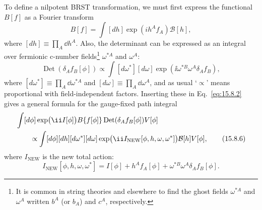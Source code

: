 To define a nilpotent BRST transformation, we must first express the functional $B[f]$ as a Fourier transform
\begin{equation}
 B[f]=\int[dh]\exp(ih^Af_A)\mathcal B[h],
 \tag{15.8.4}\label{eq:15.8.4}
\end{equation}
where $[dh]\equiv\prod_A \dd h^A$. Also, the determinant can be expressed as an integral over fermionic c-number fields\footnote{It is common in string theories and elsewhere to find the ghost fields $\omega^{*A}$ and $\omega^A$ written $b^A$ (or $b_A$) and $c^A$, respectively.} $\omega^{*A}$ and $\omega^A$:
\begin{equation}
 \operatorname{Det}(\delta_Af_B[\phi])\propto
 \int[d\omega^*][d\omega]\exp\left(\ii\omega^{*B}\omega^A\delta_Af_B\right),
 \tag{15.8.5}\label{eq:15.8.5}
\end{equation}
where $[d\omega^*]\equiv\prod_A \dd\omega^{*A}$ and $[d\omega]\equiv\prod_A \dd\omega^A$, and as usual `$\propto$' means proportional with field-independent factors. Inserting these in Eq.~\eqref{eq:15.8.2} gives a general formula for the gauge-fixed path integral
\begin{align}
 &\int[d\phi]\exp\bigl(\ii I[\phi]\bigr)B\{f[\phi]\}\operatorname{Det}(\delta_Af_B[\phi])V[\phi]\notag\\
 &\qquad\propto\int[d\phi][dh][d\omega^*][d\omega]
 \exp\bigl(\ii I_{\mathrm{NEW}}[\phi,h,\omega,\omega^*]\bigr)\mathcal B[h]V[\phi],
 \tag{15.8.6}\label{eq:15.8.6}
\end{align}
where $I_{\mathrm{NEW}}$ is the new total action:
\begin{equation}
 I_{\mathrm{NEW}}[\phi,h,\omega,\omega^*]
 =I[\phi]+h^Af_A[\phi]+\omega^{*B}\omega^A\delta_Af_B[\phi].
 \tag{15.8.7}\label{eq:15.8.7}
\end{equation}


